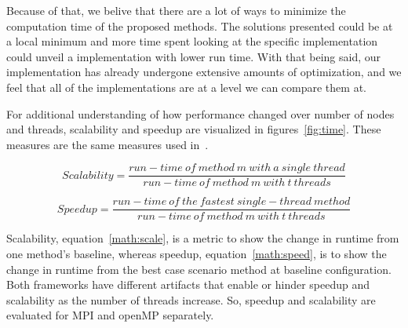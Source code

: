\documentclass[letterpaper,11pt,onecolumn]{article}
\begin{document}
Because of that, we belive that there are a lot of ways to minimize the computation time of the proposed methods. The solutions presented could be at a local minimum and more time spent looking at the specific implementation could unveil a implementation with lower run time. With that being said, our implementation has already undergone extensive amounts of optimization, and we feel that all of the implementations are at a level we can compare them at. 

For additional understanding of how performance changed over number of nodes and threads, scalability and speedup are visualized in figures~\ref{fig:time}. These measures are the same measures used in~\cite{Joyce}. 

\begin{center}
  \begin{equation}
	Scalability = \frac{run-time \ of \ method \ m \ with \ a \ single \ thread}{run-time \ of \ method \ m \ with \ t \ threads}
	\label{math:scale}
  \end{equation}
\end{center}

\begin{center}
  \begin{equation}
	Speedup = \frac{run-time \ of \ the \ fastest \ single-thread \ method}{run-time \ of \ method \ m \ with \ t \ threads}
	\label{math:speed}
  \end{equation}
\end{center}

Scalability, equation~\ref{math:scale}, is a metric to show the change in runtime from one method’s baseline, whereas speedup, equation~\ref{math:speed}, is to show the change in runtime from the best case scenario method at baseline configuration. Both frameworks have different artifacts that enable or hinder speedup and scalability as the number of threads increase. So, speedup and scalability are evaluated for MPI and openMP separately. 
\end{document}
